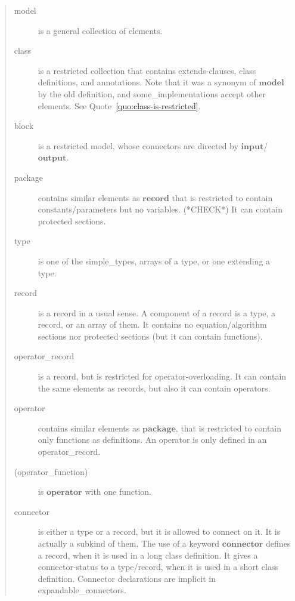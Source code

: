 \documentclass[10pt,b5paper]{article}
\begin{document}
\begin{quote}
\begin{description}

\item[model] is a general collection of elements.

\item[class] is a restricted collection that contains extends-clauses,
class definitions, and annotations.  Note that it was a synonym of
$\mathbf{model}$ by the old definition, and some_implementations
accept other elements.  See Quote~\ref{quo:class-is-restricted}.

\item[block] is a restricted {model}, whose connectors are directed by
$\mathbf{input}$/$\mathbf{output}$.

\item[package] contains similar elements as $\mathbf{record}$ that is
restricted to contain constants/parameters but no variables.
(*CHECK*) It can contain protected sections.

\item[type] is one of the simple_types, arrays of a type, or one
extending a type.

\item[record] is a record in a usual sense.  A component of a record
is a type, a record, or an array of them.  It contains no
equation/algorithm sections nor protected sections (but it can contain
functions).

\item[operator_record] is a record, but is restricted for
operator-overloading.  It can contain the same elements as records,
but also it can contain operators.

\item[operator] contains similar elements as $\mathbf{package}$, that
is restricted to contain only functions as definitions.  An operator
is only defined in an operator_record.

\item[(operator_function)] is $\mathbf{operator}$ with one function.

\item[connector] is either a {type} or a {record}, but it is allowed
to connect on it.  It is actually a subkind of them.  The use of a
keyword $\mathbf{connector}$ defines a record, when it is used in a
long class definition.  It gives a connector-status to a type/record,
when it is used in a short class definition.  Connector declarations
are implicit in expandable_connectors.


\end{description}
\end{quote}
\end{document}
